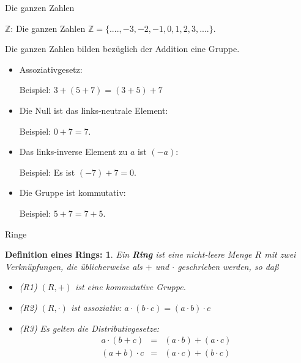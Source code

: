 \documentclass[german]{beamer}
\newcommand{\bq}{\begin{eqnarray*}}
\newcommand{\eq}{\end{eqnarray*}}
\newtheorem*{mytheorem3}{{\bf Definition eines Rings}:}
\begin{document}
\begin{frame}{Die ganzen Zahlen}

\alert{${\mathbb Z}$}: Die ganzen Zahlen ${\mathbb Z}=\{....,-3,-2,-1,0,1,2,3,....\}$. 

Die ganzen Zahlen bilden bez\"uglich der Addition eine Gruppe.

\begin{itemize}
\item Assoziativgesetz: 

Beispiel: $3 + ( 5 + 7 ) = ( 3 + 5 ) + 7$
\item Die Null ist das links-neutrale Element: 

Beispiel: $0 + 7 = 7$.
\item Das links-inverse Element zu $a$ ist $(-a)$: 

Beispiel: Es ist $(-7) + 7 = 0$.

\item Die Gruppe ist kommutativ:

Beispiel: $5 + 7 = 7 + 5$.
\end{itemize}

\end{frame}

\begin{frame}{Ringe}

\begin{mytheorem3}
Ein {\bf Ring} ist eine nicht-leere Menge $R$ mit zwei Verkn\"upfungen, die \"ublicherweise als $+$ und $\cdot$ geschrieben
werden, so da{\ss}
\begin{itemize}
\item (R1) $(R,+)$ ist eine kommutative Gruppe.
\item (R2) $(R,\cdot)$ ist assoziativ: $ a \cdot ( b \cdot c ) = ( a \cdot b ) \cdot c$
\item (R3) Es gelten die Distributivgesetze:
\bq
a \cdot ( b+ c ) &=  & (a \cdot b ) + ( a \cdot c ) \\
(a + b ) \cdot c & = & (a \cdot c) + ( b \cdot c)
\eq
\end{itemize}
\end{mytheorem3}

\end{frame}
\end{document}
